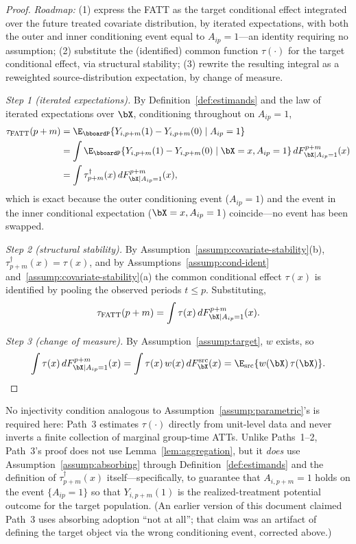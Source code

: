 \documentclass{article}
\renewcommand{\P}{\bboardP}
\begin{document}
\begin{proof}
\textit{Roadmap:} (1) express the FATT as the target conditional effect integrated over the future treated covariate distribution, by iterated expectations, with both the outer and inner conditioning event equal to $A_{ip}=1$---an identity requiring no assumption; (2) substitute the (identified) common function $\tau(\cdot)$ for the target conditional effect, via structural stability; (3) rewrite the resulting integral as a reweighted source-distribution expectation, by change of measure.

\emph{Step 1 (iterated expectations).} By Definition~\ref{def:estimands} and the law of iterated expectations over $\bX$, conditioning throughout on $A_{ip}=1$,
\begin{align*}
\tau_{\mathrm{FATT}}(p+m) &= \E_\P\{Y_{i,p+m}(1)-Y_{i,p+m}(0)\mid A_{ip}=1\} \\
&= \int \E_\P\{Y_{i,p+m}(1)-Y_{i,p+m}(0)\mid \bX=x, A_{ip}=1\}\, dF^{p+m}_{\bX\mid A_{ip}=1}(x) \\
&= \int \tau^{\dagger}_{p+m}(x)\, dF^{p+m}_{\bX\mid A_{ip}=1}(x),
\end{align*}
which is exact because the outer conditioning event ($A_{ip}=1$) and the event in the inner conditional expectation ($\bX=x, A_{ip}=1$) coincide---no event has been swapped.

\emph{Step 2 (structural stability).} By Assumption~\ref{assump:covariate-stability}(b), $\tau^{\dagger}_{p+m}(x) = \tau(x)$, and by Assumptions~\ref{assump:cond-ident} and~\ref{assump:covariate-stability}(a) the common conditional effect $\tau(x)$ is identified by pooling the observed periods $t\leq p$. Substituting,
\[
\tau_{\mathrm{FATT}}(p+m) = \int \tau(x)\, dF^{p+m}_{\bX\mid A_{ip}=1}(x).
\]

\emph{Step 3 (change of measure).} By Assumption~\ref{assump:target}, $w$ exists, so
\[
\int \tau(x)\, dF^{p+m}_{\bX\mid A_{ip}=1}(x) = \int \tau(x)\,w(x)\, dF^{\mathrm{src}}_{\bX}(x) = \E_{\mathrm{src}}\{w(\bX)\,\tau(\bX)\}. \qedhere
\]
\end{proof}

\begin{remark}
No injectivity condition analogous to Assumption~\ref{assump:parametric}'s is required here: Path~3 estimates $\tau(\cdot)$ directly from unit-level data and never inverts a finite collection of marginal group-time ATTs. Unlike Paths~1--2, Path~3's proof does not use Lemma~\ref{lem:aggregation}, but it \emph{does} use Assumption~\ref{assump:absorbing} through Definition~\ref{def:estimands} and the definition of $\tau^\dagger_{p+m}(x)$ itself---specifically, to guarantee that $A_{i,p+m}=1$ holds on the event $\{A_{ip}=1\}$ so that $Y_{i,p+m}(1)$ is the realized-treatment potential outcome for the target population. (An earlier version of this document claimed Path~3 uses absorbing adoption ``not at all''; that claim was an artifact of defining the target object via the wrong conditioning event, corrected above.)
\end{remark}
\end{document}
